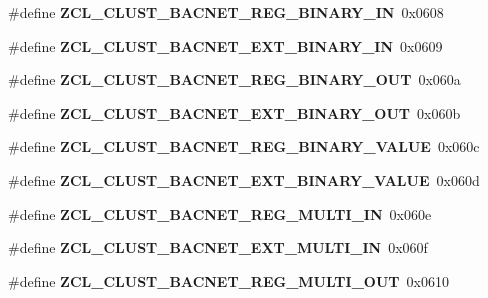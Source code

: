\begin{DoxyCompactItemize}
\#define {\bfseries Z\+C\+L\+\_\+\+C\+L\+U\+S\+T\+\_\+\+B\+A\+C\+N\+E\+T\+\_\+\+R\+E\+G\+\_\+\+B\+I\+N\+A\+R\+Y\+\_\+\+IN}~0x0608
\item 
\mbox{\label{group__zcl_gab909a7fc228d6e171a73a448d46859f5}} 
\#define {\bfseries Z\+C\+L\+\_\+\+C\+L\+U\+S\+T\+\_\+\+B\+A\+C\+N\+E\+T\+\_\+\+E\+X\+T\+\_\+\+B\+I\+N\+A\+R\+Y\+\_\+\+IN}~0x0609
\item 
\mbox{\label{group__zcl_gacd2257cf2c2ec6fef7b481191db3a1cf}} 
\#define {\bfseries Z\+C\+L\+\_\+\+C\+L\+U\+S\+T\+\_\+\+B\+A\+C\+N\+E\+T\+\_\+\+R\+E\+G\+\_\+\+B\+I\+N\+A\+R\+Y\+\_\+\+O\+UT}~0x060a
\item 
\mbox{\label{group__zcl_ga79f225dbdd3ff8341b6f061e94a86e2d}} 
\#define {\bfseries Z\+C\+L\+\_\+\+C\+L\+U\+S\+T\+\_\+\+B\+A\+C\+N\+E\+T\+\_\+\+E\+X\+T\+\_\+\+B\+I\+N\+A\+R\+Y\+\_\+\+O\+UT}~0x060b
\item 
\mbox{\label{group__zcl_gad5a654eccd9418893c386ae81cf4956f}} 
\#define {\bfseries Z\+C\+L\+\_\+\+C\+L\+U\+S\+T\+\_\+\+B\+A\+C\+N\+E\+T\+\_\+\+R\+E\+G\+\_\+\+B\+I\+N\+A\+R\+Y\+\_\+\+V\+A\+L\+UE}~0x060c
\item 
\mbox{\label{group__zcl_ga56dcda150a30a66548abee50b40a3cb1}} 
\#define {\bfseries Z\+C\+L\+\_\+\+C\+L\+U\+S\+T\+\_\+\+B\+A\+C\+N\+E\+T\+\_\+\+E\+X\+T\+\_\+\+B\+I\+N\+A\+R\+Y\+\_\+\+V\+A\+L\+UE}~0x060d
\item 
\mbox{\label{group__zcl_ga019cd5f70e44a06efce061562ccc01a4}} 
\#define {\bfseries Z\+C\+L\+\_\+\+C\+L\+U\+S\+T\+\_\+\+B\+A\+C\+N\+E\+T\+\_\+\+R\+E\+G\+\_\+\+M\+U\+L\+T\+I\+\_\+\+IN}~0x060e
\item 
\mbox{\label{group__zcl_ga36f5e811622f3ead41a075688778dc95}} 
\#define {\bfseries Z\+C\+L\+\_\+\+C\+L\+U\+S\+T\+\_\+\+B\+A\+C\+N\+E\+T\+\_\+\+E\+X\+T\+\_\+\+M\+U\+L\+T\+I\+\_\+\+IN}~0x060f
\item 
\mbox{\label{group__zcl_ga6a07b9b5a340a9e7d07b116a6f0ec722}} 
\#define {\bfseries Z\+C\+L\+\_\+\+C\+L\+U\+S\+T\+\_\+\+B\+A\+C\+N\+E\+T\+\_\+\+R\+E\+G\+\_\+\+M\+U\+L\+T\+I\+\_\+\+O\+UT}~0x0610
\item 
\mbox{\label{group__zcl_ga5db36a6dbe5a242aa6f6adb2dbfd4164}} 

\end{DoxyCompactItemize}

